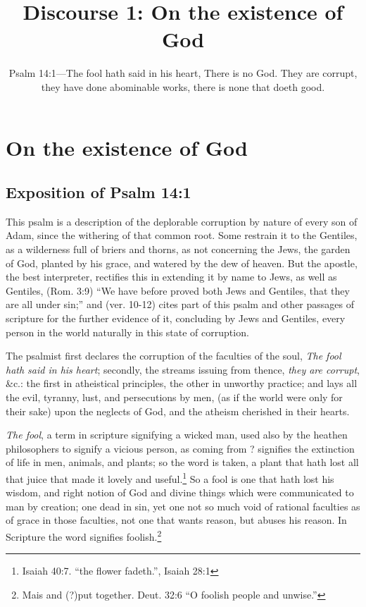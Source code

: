 \documentclass[a5paper]{book}
\title{Discourse 1: On the existence of God}
\date{Psalm 14:1---The fool hath said in his heart, There is no God. They are corrupt, they have done abominable works, there is none that doeth good.}
\begin{document}
\maketitle
\chapter{On the existence of God}
\section{Exposition of Psalm 14:1}
This psalm is a description 
    of the deplorable corruption by nature of every son of Adam, 
    since the withering of that common root.
Some restrain it to the Gentiles, 
    as a wilderness full of briers and thorns, 
    as not concerning the Jews, the garden of God, 
    planted by his grace, and watered by the dew of heaven. 
But the apostle, the best interpreter, 
    rectifies this in extending it by name to Jews, as well as Gentiles, 
    (Rom. 3:9) ``We have before proved both Jews and Gentiles, 
    that they are all under sin;'' and 
    (ver. 10-12) cites part of this psalm and other passages of scripture 
    for the further evidence of it, 
    concluding by Jews and Gentiles, 
    every person in the world naturally in this state of corruption.

The psalmist first declares the corruption of the faculties of the soul, 
    \emph{The fool hath said in his heart}; 
    secondly, the streams issuing from thence, \emph{they are corrupt}, \&c.: 
    the first in atheistical principles,
    the other in unworthy practice; 
    and lays all the evil, tyranny, lust, and persecutions by men, 
    (as if the world were only for their sake) upon the neglects of God, 
    and the atheism cherished in their hearts.

\emph{The fool}, a term in scripture signifying a wicked man, 
    used also by the heathen philosophers to signify a vicious person, 
     as coming from ? 
    signifies the extinction of life in men, animals, and plants; 
    so the word  is taken, 
    a plant that hath lost all that juice that made it lovely and useful.\footnote{
        Isaiah 40:7.  ``the flower fadeth.'', Isaiah 28:1} 
So a fool is one that hath lost his wisdom, 
    and right notion of God and divine things 
    which were communicated to man by creation; 
    one dead in sin, 
    yet one not so much void of rational faculties 
    as of grace in those faculties, 
    not one that wants reason, but abuses his reason. 
In Scripture the word signifies foolish.\footnote{
        Mais  and (?)put together. 
        Deut. 32:6 ``O foolish people and unwise.''} 
\end{document}
